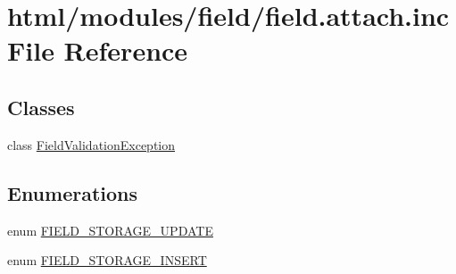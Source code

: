 \hypertarget{field_8attach_8inc}{
\section{html/modules/field/field.attach.inc File Reference}
\label{field_8attach_8inc}
}
\subsection*{Classes}
\begin{DoxyCompactItemize}
\item 
class \hyperlink{classFieldValidationException}{FieldValidationException}
\end{DoxyCompactItemize}
\subsection*{Enumerations}
\begin{DoxyCompactItemize}
\item 
enum \hyperlink{group__field__storage_ga45ab1b1aff3e5823611963cca1565954}{FIELD\_\-STORAGE\_\-UPDATE} 
\item 
enum \hyperlink{group__field__storage_ga111f1bae2368f363e9d68469e8a11fdf}{FIELD\_\-STORAGE\_\-INSERT} 
\end{DoxyCompactItemize}
